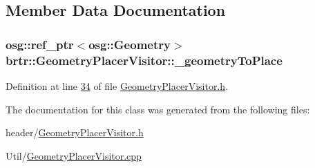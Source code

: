 \subsection{Member Data Documentation}
\hypertarget{classbrtr_1_1_geometry_placer_visitor_a171826d64ddd04161d7525bc60faf045}{
\subsubsection[{\+\_\+geometry\+To\+Place}]{\setlength{\rightskip}{0pt plus 5cm}osg\+::ref\+\_\+ptr$<$osg\+::\+Geometry$>$ brtr\+::\+Geometry\+Placer\+Visitor\+::\+\_\+geometry\+To\+Place\hspace{0.3cm}{\ttfamily [private]}}}\label{classbrtr_1_1_geometry_placer_visitor_a171826d64ddd04161d7525bc60faf045}


Definition at line \hyperlink{_geometry_placer_visitor_8h_source_l00034}{34} of file \hyperlink{_geometry_placer_visitor_8h_source}{Geometry\+Placer\+Visitor.\+h}.



The documentation for this class was generated from the following files\+:\begin{DoxyCompactItemize}
\item 
header/\hyperlink{_geometry_placer_visitor_8h}{Geometry\+Placer\+Visitor.\+h}\item 
Util/\hyperlink{_geometry_placer_visitor_8cpp}{Geometry\+Placer\+Visitor.\+cpp}\end{DoxyCompactItemize}
